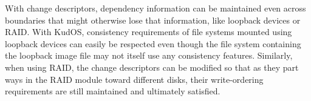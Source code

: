 With change descriptors,
dependency information can be maintained even across boundaries that might
otherwise lose that information, like loopback devices or RAID. With KudOS,
consistency requirements of file systems mounted using loopback devices can
easily be respected even though the file system containing the loopback image
file may not itself use any consistency features. Similarly, when using RAID,
the change descriptors can be modified so that as they part ways in the RAID
module toward different disks, their write-ordering requirements are still
maintained and ultimately satisfied.

